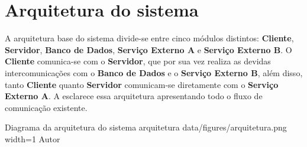 \section{Arquitetura do sistema}
\label{sec:arquitetura}

A arquitetura base do sistema divide-se entre cinco módulos distintos: \textbf{Cliente}, \textbf{Servidor}, \textbf{Banco de Dados}, \textbf{Serviço Externo A} e \textbf{Serviço Externo B}. O \textbf{Cliente} comunica-se com o \textbf{Servidor}, que por sua vez realiza as devidas intercomunicações com o \textbf{Banco de Dados} e o \textbf{Serviço Externo B}, além disso, tanto \textbf{Cliente} quanto \textbf{Servidor} comunicam-se diretamente com o \textbf{Serviço Externo A}. A  esclarece essa arquitetura apresentando todo o fluxo de comunicação existente.

\image
    {Diagrama da arquitetura do sistema}
    {arquitetura}
    {data/figures/arquitetura.png}
    {width=1\textwidth}
    {Autor}